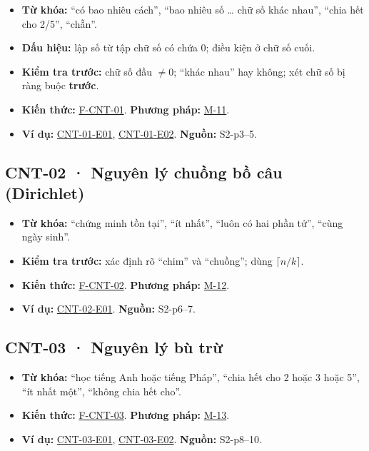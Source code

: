 \documentclass[
  10pt,
  twoside,openany]{book}
\providecommand{\tightlist}{%
  \setlength{\itemsep}{0pt}\setlength{\parskip}{0pt}}
\begin{document}
\begin{itemize}
\tightlist
\item
  \textbf{Từ khóa:} ``có bao nhiêu cách'', ``bao nhiêu số \ldots{} chữ
  số khác nhau'', ``chia hết cho 2/5'', ``chẵn''.
\item
  \textbf{Dấu hiệu:} lập số từ tập chữ số có chứa 0; điều kiện ở chữ số
  cuối.
\item
  \textbf{Kiểm tra trước:} chữ số đầu \(\ne0\); ``khác nhau'' hay không;
  xét chữ số bị ràng buộc \textbf{trước}.
\item
  \textbf{Kiến thức:} \protect\hyperlink{F-CNT-01}{F-CNT-01}.
  \textbf{Phương pháp:} \protect\hyperlink{M-11}{M-11}.
\item
  \textbf{Ví dụ:} \protect\hyperlink{CNT-01-E01}{CNT-01-E01},
  \protect\hyperlink{CNT-01-E02}{CNT-01-E02}. \textbf{Nguồn:} S2-p3--5.
\end{itemize}

\hypertarget{CNT-02}{%
\subsection{CNT-02 · Nguyên lý chuồng bồ câu (Dirichlet)}\label{CNT-02}}

\begin{itemize}
\tightlist
\item
  \textbf{Từ khóa:} ``chứng minh tồn tại'', ``ít nhất'', ``luôn có hai
  phần tử'', ``cùng ngày sinh''.
\item
  \textbf{Kiểm tra trước:} xác định rõ ``chim'' và ``chuồng''; dùng
  \(\lceil n/k\rceil\).
\item
  \textbf{Kiến thức:} \protect\hyperlink{F-CNT-02}{F-CNT-02}.
  \textbf{Phương pháp:} \protect\hyperlink{M-12}{M-12}.
\item
  \textbf{Ví dụ:} \protect\hyperlink{CNT-02-E01}{CNT-02-E01}.
  \textbf{Nguồn:} S2-p6--7.
\end{itemize}

\hypertarget{CNT-03}{%
\subsection{CNT-03 · Nguyên lý bù trừ}\label{CNT-03}}

\begin{itemize}
\tightlist
\item
  \textbf{Từ khóa:} ``học tiếng Anh hoặc tiếng Pháp'', ``chia hết cho 2
  hoặc 3 hoặc 5'', ``ít nhất một'', ``không chia hết cho''.
\item
  \textbf{Kiến thức:} \protect\hyperlink{F-CNT-03}{F-CNT-03}.
  \textbf{Phương pháp:} \protect\hyperlink{M-13}{M-13}.
\item
  \textbf{Ví dụ:} \protect\hyperlink{CNT-03-E01}{CNT-03-E01},
  \protect\hyperlink{CNT-03-E02}{CNT-03-E02}. \textbf{Nguồn:} S2-p8--10.
\end{itemize}
\end{document}
